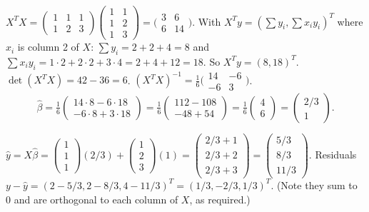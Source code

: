 \begin{solutions}
  \item $X^{T} X = \begin{pmatrix} 1 & 1 & 1 \\ 1 & 2 & 3 \end{pmatrix} \begin{pmatrix} 1 & 1 \\ 1 & 2 \\ 1 & 3 \end{pmatrix} = \bigl(\begin{smallmatrix} 3 & 6 \\ 6 & 14 \end{smallmatrix}\bigr)$.
        With $X^{T} y = (\sum y_{i}, \sum x_{i} y_{i})^{T}$ where $x_{i}$ is
        column 2 of $X$: $\sum y_{i} = 2 + 2 + 4 = 8$ and
        $\sum x_{i} y_{i} = 1 \cdot 2 + 2 \cdot 2 + 3 \cdot 4 = 2 + 4 + 12 = 18$.
        So $X^{T} y = (8, 18)^{T}$.
        $\det(X^{T} X) = 42 - 36 = 6$.
        $(X^{T} X)^{-1} = \tfrac{1}{6}\bigl(\begin{smallmatrix} 14 & -6 \\ -6 & 3 \end{smallmatrix}\bigr)$.
        \[
        \hat{\beta} = \tfrac{1}{6}\begin{pmatrix} 14 \cdot 8 - 6 \cdot 18 \\ -6 \cdot 8 + 3 \cdot 18 \end{pmatrix} = \tfrac{1}{6}\begin{pmatrix} 112 - 108 \\ -48 + 54 \end{pmatrix} = \tfrac{1}{6}\begin{pmatrix} 4 \\ 6 \end{pmatrix} = \begin{pmatrix} 2/3 \\ 1 \end{pmatrix}.
        \]

  \item $\hat{y} = X \hat{\beta} = \begin{pmatrix} 1 \\ 1 \\ 1 \end{pmatrix}(2/3) + \begin{pmatrix} 1 \\ 2 \\ 3 \end{pmatrix}(1) = \begin{pmatrix} 2/3 + 1 \\ 2/3 + 2 \\ 2/3 + 3 \end{pmatrix} = \begin{pmatrix} 5/3 \\ 8/3 \\ 11/3 \end{pmatrix}$.
        Residuals
        $y - \hat{y} = (2 - 5/3, 2 - 8/3, 4 - 11/3)^{T} = (1/3, -2/3, 1/3)^{T}$.
        (Note they sum to $0$ and are orthogonal to each column of $X$, as
        required.)


\end{solutions}
